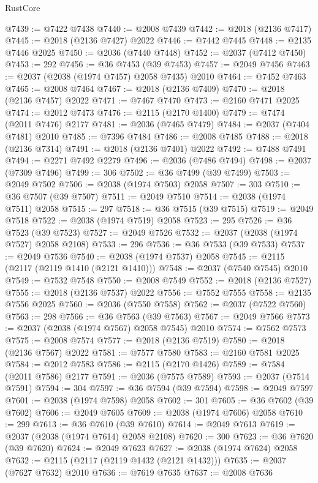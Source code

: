 \begin{lexlean}{RustCore}
\begin{coremodule}
@7439 := @7422 @7438
@7440 := @2008 @7439
@7442 := @2018 (@2136 @7417)
@7445 := @2018 (@2136 @7427) @2022
@7446 := @7442 @7445
@7448 := @2135 @7446 @2025
@7450 := @2036 (@7440 @7448)
@7452 := @2037 (@7412 @7450)
@7453 := 292
@7456 := @36 @7453 (@39 @7453)
@7457 := @2049 @7456
@7463 := @2037 (@2038 (@1974 @7457) @2058 @7435) @2010
@7464 := @7452 @7463
@7465 := @2008 @7464
@7467 := @2018 (@2136 @7409)
@7470 := @2018 (@2136 @7457) @2022
@7471 := @7467 @7470
@7473 := @2160 @7471 @2025
@7474 := @2012 @7473
@7476 := @2115 (@2170 @1400)
@7479 := @7474 (@2011 @7476) @2177
@7481 := @2036 (@7465 @7479)
@7484 := @2037 (@7404 @7481) @2010
@7485 := @7396 @7484
@7486 := @2008 @7485
@7488 := @2018 (@2136 @7314)
@7491 := @2018 (@2136 @7401) @2022
@7492 := @7488 @7491
@7494 := @2271 @7492 @2279
@7496 := @2036 (@7486 @7494)
@7498 := @2037 (@7309 @7496)
@7499 := 306
@7502 := @36 @7499 (@39 @7499)
@7503 := @2049 @7502
@7506 := @2038 (@1974 @7503) @2058
@7507 := 303
@7510 := @36 @7507 (@39 @7507)
@7511 := @2049 @7510
@7514 := @2038 (@1974 @7511) @2058
@7515 := 297
@7518 := @36 @7515 (@39 @7515)
@7519 := @2049 @7518
@7522 := @2038 (@1974 @7519) @2058
@7523 := 295
@7526 := @36 @7523 (@39 @7523)
@7527 := @2049 @7526
@7532 := @2037 (@2038 (@1974 @7527) @2058 @2108)
@7533 := 296
@7536 := @36 @7533 (@39 @7533)
@7537 := @2049 @7536
@7540 := @2038 (@1974 @7537) @2058
@7545 := @2115 (@2117 (@2119 @1410 (@2121 @1410)))
@7548 := @2037 (@7540 @7545) @2010
@7549 := @7532 @7548
@7550 := @2008 @7549
@7552 := @2018 (@2136 @7527)
@7555 := @2018 (@2136 @7537) @2022
@7556 := @7552 @7555
@7558 := @2135 @7556 @2025
@7560 := @2036 (@7550 @7558)
@7562 := @2037 (@7522 @7560)
@7563 := 298
@7566 := @36 @7563 (@39 @7563)
@7567 := @2049 @7566
@7573 := @2037 (@2038 (@1974 @7567) @2058 @7545) @2010
@7574 := @7562 @7573
@7575 := @2008 @7574
@7577 := @2018 (@2136 @7519)
@7580 := @2018 (@2136 @7567) @2022
@7581 := @7577 @7580
@7583 := @2160 @7581 @2025
@7584 := @2012 @7583
@7586 := @2115 (@2170 @1426)
@7589 := @7584 (@2011 @7586) @2177
@7591 := @2036 (@7575 @7589)
@7593 := @2037 (@7514 @7591)
@7594 := 304
@7597 := @36 @7594 (@39 @7594)
@7598 := @2049 @7597
@7601 := @2038 (@1974 @7598) @2058
@7602 := 301
@7605 := @36 @7602 (@39 @7602)
@7606 := @2049 @7605
@7609 := @2038 (@1974 @7606) @2058
@7610 := 299
@7613 := @36 @7610 (@39 @7610)
@7614 := @2049 @7613
@7619 := @2037 (@2038 (@1974 @7614) @2058 @2108)
@7620 := 300
@7623 := @36 @7620 (@39 @7620)
@7624 := @2049 @7623
@7627 := @2038 (@1974 @7624) @2058
@7632 := @2115 (@2117 (@2119 @1432 (@2121 @1432)))
@7635 := @2037 (@7627 @7632) @2010
@7636 := @7619 @7635
@7637 := @2008 @7636

\end{coremodule}
\end{lexlean}
